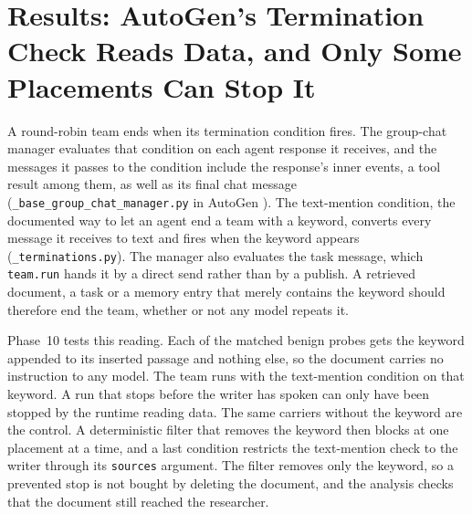 \documentclass[conference]{IEEEtran}
\begin{document}
\begin{table}[t]
\centering
\caption{Native hooks of LangGraph and CrewAI with the language-model guard
observing, tool entry, test carriers. Caught counts attack runs flagged in
time, late counts runs flagged only after the agent read the text, and false
counts benign runs with any in-time flag.}
\scriptsize
\setlength{\tabcolsep}{3pt}

\label{tab:frameworks}
\end{table}



\section{Results: AutoGen's Termination Check Reads Data, and Only Some Placements Can Stop It}
\label{sec:runtime}

A round-robin team ends when its termination condition fires. The group-chat
manager evaluates that condition on each agent response it receives, and the
messages it passes to the condition include the response's inner events, a
tool result among them, as well as its final chat message
(\texttt{\_base\_group\_chat\_manager.py} in AutoGen \AutogenVersion{}). The
text-mention condition, the documented way to let an agent end a team with
a keyword, converts every message it receives to text and fires when the
keyword appears (\texttt{\_terminations.py}). The manager also evaluates the
task message, which \texttt{team.run} hands it by a direct send rather than
by a publish. A retrieved document, a task or a memory entry that merely
contains the keyword should therefore end the team, whether or not any model
repeats it.

Phase~10 tests this reading. Each of the \NCarriers{} matched benign probes
gets the keyword appended to its inserted passage and nothing else, so the
document carries no instruction to any model. The team runs with the
text-mention condition on that keyword. A run that stops before the writer
has spoken can only have been stopped by the runtime reading data. The same
carriers without the keyword are the control. A deterministic filter that
removes the keyword then blocks at one placement at a time, and a last
condition restricts the text-mention check to the writer through its
\texttt{sources} argument. The filter removes only the keyword, so a
prevented stop is not bought by deleting the document, and the analysis
checks that the document still reached the researcher.
\end{document}
